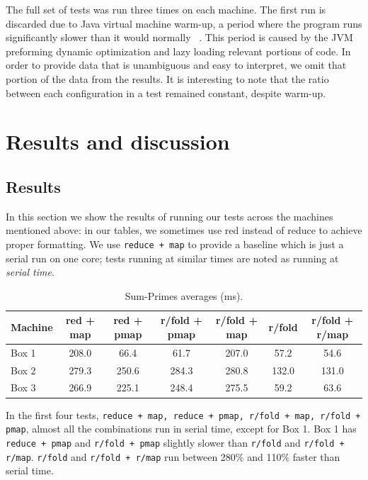 \documentclass[12pt]{article}
\newcommand{\comment}[1]{{\bf \tt  {#1}}}
\newcommand{\emcomment}[1]{\textcolor{ForestGreen}{\comment{Elena: {#1}}}}
\newcommand{\clocode}[1]{{\texttt {#1}}}
\begin{document}
The full set of tests was run three times on each machine. The first run is discarded due to Java virtual machine warm-up, a period where the program runs significantly slower than it would normally~\cite{Blackburn:2008} . This period is caused by the JVM preforming dynamic optimization and lazy loading relevant portions of code. In order to provide data that is unambiguous and easy to interpret, we omit that portion of the data from the results. It is interesting to note that the ratio between each configuration in a test remained constant, despite warm-up.


\section{Results and discussion}\label{sec:results-disc}
\subsection{Results}\label{sec:results}
In this section we show the results of running our tests across the machines mentioned above: in our tables, we sometimes use red instead of reduce to achieve proper formatting. We use \clocode{reduce + map} to provide a baseline which is just a serial run on one core; tests running at similar times are noted as running at {\it serial time}.

\begin{table}[h!]
\begin{center}
\begin{tabular}{|l|c|c|c|c|c|c|}
\hline
Machine & red + map & red + pmap & r/fold + pmap & r/fold + map & r/fold & r/fold + r/map \\
\hline
Box 1 & 208.0 & 66.4 & 61.7 & 207.0 & 57.2 &  54.6 \\
Box 2 & 279.3 & 250.6 & 284.3 & 280.8 & 132.0 & 131.0 \\
Box 3 & 266.9 & 225.1 & 248.4 & 275.5 & 59.2 & 63.6 \\
\hline
\end{tabular}
\end{center}
\caption{Sum-Primes averages (ms).}\label{table:sum-primes}
\end{table}

 In the first four tests, \clocode{reduce + map, reduce + pmap, r/fold + map, r/fold + pmap}, almost all the combinations run in serial time, except for Box 1. Box 1 has \clocode{reduce + pmap} and \clocode{r/fold + pmap} slightly slower than \clocode{r/fold} and \clocode{r/fold + r/map}. \clocode{r/fold} and \clocode{r/fold + r/map} run between 280\% and 110\% faster than serial time.
\end{document}
